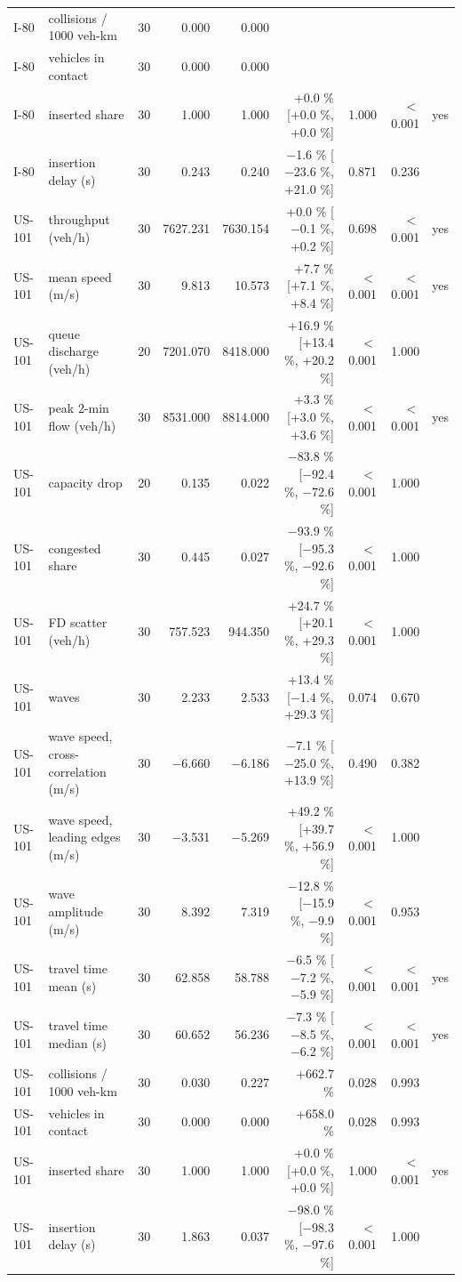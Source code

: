 \begin{table}[htbp]
{\begin{tabular}{llrrrrrrl}
I-80 & collisions / 1000 veh-km & 30 & 0.000 & 0.000 &  &  &  &  \\
I-80 & vehicles in contact & 30 & 0.000 & 0.000 &  &  &  &  \\
I-80 & inserted share & 30 & 1.000 & 1.000 & +0.0 \% [+0.0 \%, +0.0 \%] & 1.000 & $<$0.001 & yes \\
I-80 & insertion delay (s) & 30 & 0.243 & 0.240 & $-$1.6 \% [$-$23.6 \%, +21.0 \%] & 0.871 & 0.236 &  \\
US-101 & throughput (veh/h) & 30 & 7627.231 & 7630.154 & +0.0 \% [$-$0.1 \%, +0.2 \%] & 0.698 & $<$0.001 & yes \\
US-101 & mean speed (m/s) & 30 & 9.813 & 10.573 & +7.7 \% [+7.1 \%, +8.4 \%] & $<$0.001 & $<$0.001 & yes \\
US-101 & queue discharge (veh/h) & 20 & 7201.070 & 8418.000 & +16.9 \% [+13.4 \%, +20.2 \%] & $<$0.001 & 1.000 &  \\
US-101 & peak 2-min flow (veh/h) & 30 & 8531.000 & 8814.000 & +3.3 \% [+3.0 \%, +3.6 \%] & $<$0.001 & $<$0.001 & yes \\
US-101 & capacity drop & 20 & 0.135 & 0.022 & $-$83.8 \% [$-$92.4 \%, $-$72.6 \%] & $<$0.001 & 1.000 &  \\
US-101 & congested share & 30 & 0.445 & 0.027 & $-$93.9 \% [$-$95.3 \%, $-$92.6 \%] & $<$0.001 & 1.000 &  \\
US-101 & FD scatter (veh/h) & 30 & 757.523 & 944.350 & +24.7 \% [+20.1 \%, +29.3 \%] & $<$0.001 & 1.000 &  \\
US-101 & waves & 30 & 2.233 & 2.533 & +13.4 \% [$-$1.4 \%, +29.3 \%] & 0.074 & 0.670 &  \\
US-101 & wave speed, cross-correlation (m/s) & 30 & $-$6.660 & $-$6.186 & $-$7.1 \% [$-$25.0 \%, +13.9 \%] & 0.490 & 0.382 &  \\
US-101 & wave speed, leading edges (m/s) & 30 & $-$3.531 & $-$5.269 & +49.2 \% [+39.7 \%, +56.9 \%] & $<$0.001 & 1.000 &  \\
US-101 & wave amplitude (m/s) & 30 & 8.392 & 7.319 & $-$12.8 \% [$-$15.9 \%, $-$9.9 \%] & $<$0.001 & 0.953 &  \\
US-101 & travel time mean (s) & 30 & 62.858 & 58.788 & $-$6.5 \% [$-$7.2 \%, $-$5.9 \%] & $<$0.001 & $<$0.001 & yes \\
US-101 & travel time median (s) & 30 & 60.652 & 56.236 & $-$7.3 \% [$-$8.5 \%, $-$6.2 \%] & $<$0.001 & $<$0.001 & yes \\
US-101 & collisions / 1000 veh-km & 30 & 0.030 & 0.227 & +662.7 \% & 0.028 & 0.993 &  \\
US-101 & vehicles in contact & 30 & 0.000 & 0.000 & +658.0 \% & 0.028 & 0.993 &  \\
US-101 & inserted share & 30 & 1.000 & 1.000 & +0.0 \% [+0.0 \%, +0.0 \%] & 1.000 & $<$0.001 & yes \\
US-101 & insertion delay (s) & 30 & 1.863 & 0.037 & $-$98.0 \% [$-$98.3 \%, $-$97.6 \%] & $<$0.001 & 1.000 &  \\
\bottomrule
\end{tabular}
}
\end{table}
